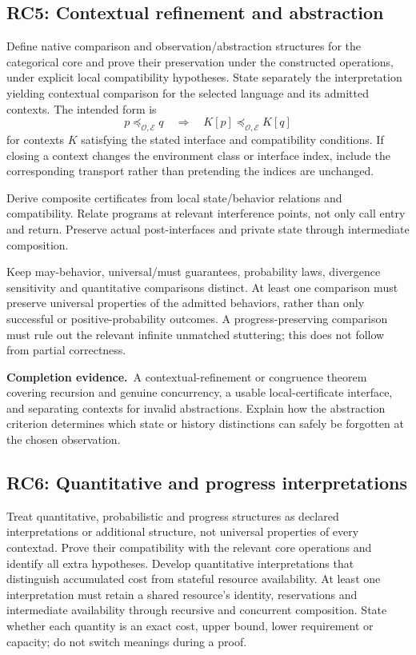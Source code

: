 \documentclass[11pt,a4paper]{article}
\newcommand{\deliver}{\par\textbf{Completion evidence.}\ }
\begin{document}
\subsection*{RC5: Contextual refinement and abstraction}\label{rc5}
Define native comparison and observation/abstraction structures for the categorical core and prove their preservation under the constructed operations, under explicit local compatibility hypotheses. State separately the interpretation yielding contextual comparison for the selected language and its admitted contexts. The intended form is
\[
p\preceq_{\mathcal O,\mathcal E}q
\quad\Longrightarrow\quad
K[p]\preceq_{\mathcal O,\mathcal E}K[q]
\]
for contexts \(K\) satisfying the stated interface and compatibility conditions. If closing a context changes the environment class or interface index, include the corresponding transport rather than pretending the indices are unchanged.

Derive composite certificates from local state/behavior relations and compatibility. Relate programs at relevant interference points, not only call entry and return. Preserve actual post-interfaces and private state through intermediate composition.

Keep may-behavior, universal/must guarantees, probability laws, divergence sensitivity and quantitative comparisons distinct. At least one comparison must preserve universal properties of the admitted behaviors, rather than only successful or positive-probability outcomes. A progress-preserving comparison must rule out the relevant infinite unmatched stuttering; this does not follow from partial correctness.

\deliver A contextual-refinement or congruence theorem covering recursion and genuine concurrency, a usable local-certificate interface, and separating contexts for invalid abstractions. Explain how the abstraction criterion determines which state or history distinctions can safely be forgotten at the chosen observation.

\subsection*{RC6: Quantitative and progress interpretations}\label{rc6}
Treat quantitative, probabilistic and progress structures as declared interpretations or additional structure, not universal properties of every contextad. Prove their compatibility with the relevant core operations and identify all extra hypotheses. Develop quantitative interpretations that distinguish accumulated cost from stateful resource availability. At least one interpretation must retain a shared resource's identity, reservations and intermediate availability through recursive and concurrent composition. State whether each quantity is an exact cost, upper bound, lower requirement or capacity; do not switch meanings during a proof.
\end{document}

